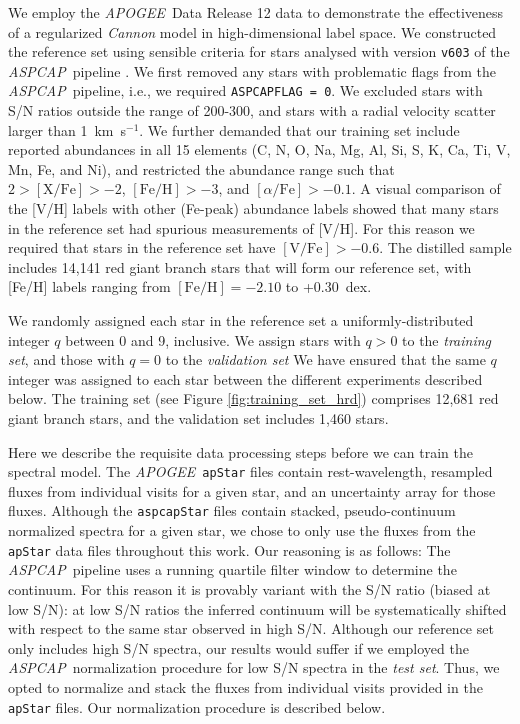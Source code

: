 \documentclass[12pt,preprint]{aastex}
\newcommand{\project}[1]{\textsl{#1}}
\newcommand{\acronym}[1]{{\small{#1}}}
\newcommand{\apogee}{\project{\acronym{APOGEE}}}
\newcommand{\aspcap}{\project{\acronym{ASPCAP}}}
\begin{document}
We employ the \apogee\ Data Release 12 data \citep{SDSS_DR12} to demonstrate the effectiveness of
a regularized \emph{Cannon} model in high-dimensional label space.  We 
constructed the reference set using sensible criteria for stars analysed with 
version \texttt{v603} of the \aspcap\ pipeline \citep{Holtzman_16,Garcia_Perez_2016}.  We first removed 
any stars with problematic flags from the \aspcap\ pipeline, i.e., we required 
\texttt{ASPCAPFLAG~=~0}.  We excluded stars with S/N ratios outside the range of
200-300, and stars with a radial velocity scatter larger than 1~km~s$^{-1}$.  We
further demanded that our training set include reported abundances in all 15 
elements (C, N, O, Na, Mg, Al, Si, S, K, Ca, Ti, V, Mn, Fe, and Ni), and 
restricted the abundance range such that $2 > \mathrm{[X/Fe]} > -2$, 
$\mathrm{[Fe/H]} > -3$, and $[\alpha/\mathrm{Fe}] > -0.1$.  A visual comparison 
of the [V/H] labels with other (Fe-peak) abundance labels showed that many stars
in the reference set had spurious measurements of [V/H].  For this reason we 
required that stars in the reference set have $\mathrm{[V/Fe]} > -0.6$.  The 
distilled sample includes 14,141 red giant branch stars that will form our 
reference set, with [Fe/H] labels ranging from $\mathrm{[Fe/H]} = -2.10$ to 
+0.30~dex.


We randomly assigned each star in the reference set a uniformly-distributed 
integer $q$ between 0 and 9, inclusive.  We assign stars with $q > 0$
 to the \emph{training set}, and those with $q = 0$ to the \emph{validation set}
 We have ensured that the same $q$ integer was assigned to each star 
between the different experiments described below.  The training set (see Figure
\ref{fig:training_set_hrd}) comprises 12,681 red giant branch stars, and the 
validation set includes 1,460 stars.


Here we describe the requisite data processing steps before we can train the 
spectral model.  The \apogee\ \texttt{apStar} files contain rest-wavelength, 
resampled fluxes from individual visits for a given star, and an uncertainty array for
those fluxes.  Although the \texttt{aspcapStar} files contain stacked, 
pseudo-continuum normalized spectra for a given star, we chose to only use the 
fluxes from the \texttt{apStar} data files throughout this work.  Our reasoning 
is as follows: The \aspcap\ pipeline uses a running quartile filter window to determine 
the continuum.  For this reason it is provably variant with the S/N ratio (biased at low S/N): at 
low S/N ratios the inferred continuum will be systematically shifted with 
respect to the same star observed in high S/N.  Although our reference set only 
includes high S/N spectra, our results would suffer if we employed the \aspcap\ 
normalization procedure for low S/N spectra in the \emph{test set}.  Thus, we 
opted to normalize and stack the fluxes from individual visits provided in the 
\texttt{apStar} files. Our normalization procedure is described below.
\end{document}
